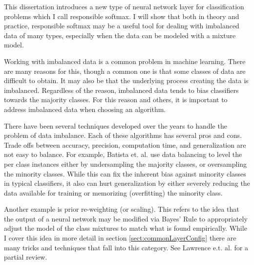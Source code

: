 
This dissertation introduces a new type of neural network layer for classification problems which I call responsible softmax.   I will show that both in theory and practice, responsible softmax may be a useful tool for dealing with imbalanced data of many types, especially when the data can be modeled with a mixture model.

Working with imbalanced data is a common problem in machine learning. There are many reasons for this, though a common one is that some classes of data are difficult to obtain. It may also be that the underlying process creating the data is imbalanced. Regardless of the reason, imbalanced data tends to bias classifiers towards the majority classes.  For this reason and others, it is important to address imbalanced data when choosing an algorithm.

There have been several techniques developed over the years to handle the problem of data imbalance. Each of these algorithms has several pros and cons. Trade offs between accuracy, precision, computation time, and generalization are not easy to balance. For example, Batista et. al. \cite{DataBalancing} use data balancing to level the per class instances either by undersampling the majority classes, or oversampling the minority classes.  While this can fix the inherent bias against minority classes in typical classifiers, it also can hurt generalization by either severely reducing the data available for training or memorizing (overfitting) the minority class. 

Another example is prior re-weighting (or scaling).  This refers to the idea that the output of a neural network may be modified via Bayes' Rule to appropriately adjust the model of the class mixtures to match what is found empirically.  While I cover this idea in more detail in section \ref{sect:commonLayerConfig} there are many tricks and techniques that fall into this category. See Lawrence e.t. al. \citep{Lawrence2012} for a partial review.

